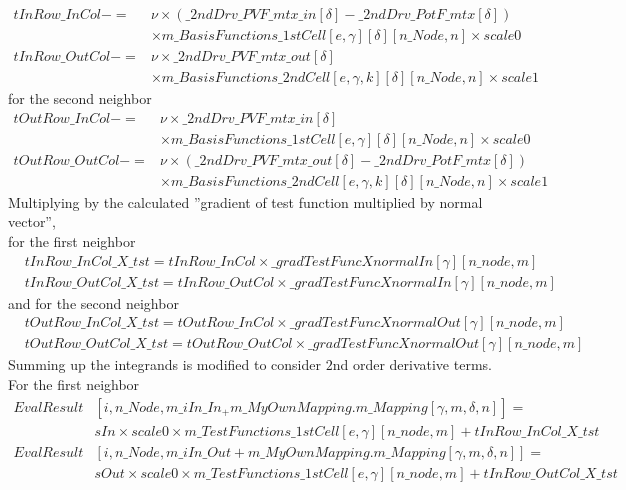 \documentclass[BoSSSForSolvingConservationLaws.tex]{subfiles}
\begin{document}
\begin{align*}
tInRow\_InCol -=&\nu \times (\_2ndDrv\_PVF\_mtx\_in[\delta] - \_2ndDrv\_PotF\_mtx[\delta]) \\
&\times m\_BasisFunctions\_1stCell[e, \gamma][\delta][n\_Node, n] \times scale0\\
tInRow\_OutCol -=& \nu \times \_2ndDrv\_PVF\_mtx\_out[\delta] \\
&\times m\_BasisFunctions\_2ndCell[e, \gamma, k][\delta][n\_Node, n] \times scale1
\end{align*}
for the second neighbor
\begin{align*}
tOutRow\_InCol -=& \nu \times \_2ndDrv\_PVF\_mtx\_in[\delta] \\
&\times m\_BasisFunctions\_1stCell[e, \gamma][\delta][n\_Node, n] \times scale0\\
tOutRow\_OutCol -=& \nu \times (\_2ndDrv\_PVF\_mtx\_out[\delta] - \_2ndDrv\_PotF\_mtx[\delta])\\
&\times m\_BasisFunctions\_2ndCell[e, \gamma, k][\delta][n\_Node, n] \times scale1
\end{align*}
Multiplying by the calculated ''gradient of test function multiplied by normal vector'',\\
for the first neighbor
\begin{align*}
&tInRow\_InCol\_X\_tst = tInRow\_InCol \times \_gradTestFuncXnormalIn[\gamma][n\_node,m]\\
&tInRow\_OutCol\_X\_tst = tInRow\_OutCol \times \_gradTestFuncXnormalIn[\gamma][n\_node,m]
\end{align*}
and for the second neighbor
\begin{align*}
&tOutRow\_InCol\_X\_tst = tOutRow\_InCol \times \_gradTestFuncXnormalOut[\gamma][n\_node,m]\\
&tOutRow\_OutCol\_X\_tst = tOutRow\_OutCol \times \_gradTestFuncXnormalOut[\gamma][n\_node,m]
\end{align*}
Summing up the integrands is modified to consider $2$nd order derivative terms.\\
For the first neighbor
\begin{align*}
EvalResult&[i, n\_Node, m\_iIn\_In_ + m\_MyOwnMapping.m\_Mapping[\gamma, m, \delta, n]] = \\&sIn \times scale0 \times m\_TestFunctions\_1stCell[e, \gamma][n\_node,m] + tInRow\_InCol\_X\_tst\\
EvalResult&[i, n\_Node, m\_iIn\_Out + m\_MyOwnMapping.m\_Mapping[\gamma, m, \delta, n]] = \\&sOut \times scale0 \times m\_TestFunctions\_1stCell[e, \gamma][n\_node,m] + tInRow\_OutCol\_X\_tst
\end{align*}
\end{document}
